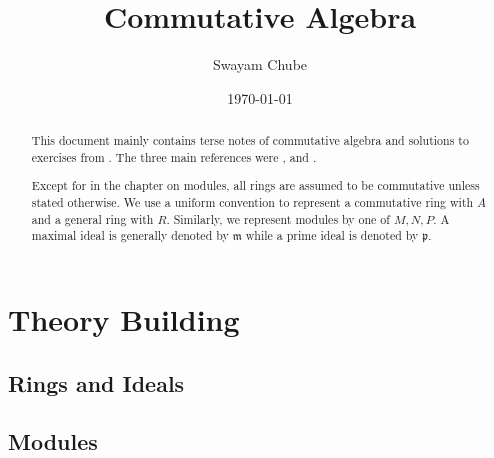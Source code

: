 \documentclass[12pt]{report}
\title{Commutative Algebra}
\author{Swayam Chube}
\date{\today}
\begin{document}
\maketitle

\begin{abstract}
This document mainly contains terse notes of commutative algebra and solutions to exercises from \cite{atiyah-macdonald}. The three main references were \cite{atiyah-macdonald}, \cite{dummit-foote} and \cite{lang}. 

Except for in the chapter on modules, all rings are assumed to be commutative unless stated otherwise. We use a uniform convention to represent a commutative ring with $A$ and a general ring with $R$. Similarly, we represent modules by one of $M, N, P$. A maximal ideal is generally denoted by $\mathfrak m$ while a prime ideal is denoted by $\mathfrak p$.
\end{abstract}

\tableofcontents


\part{Theory Building}
\chapter{Rings and Ideals}


\chapter{Modules}


% 



\end{document}
